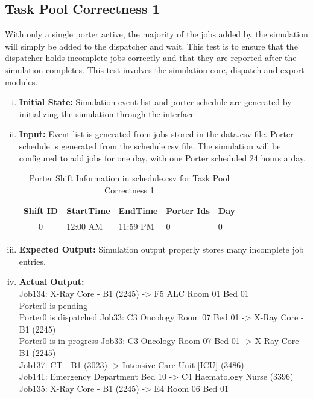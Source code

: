 \documentclass[paper=letter, fontsize=10pt]{scrartcl}
\numberwithin{equation}{section}		%
\numberwithin{figure}{section}			%
\numberwithin{table}{section}				%
\begin{document}
\begin{enumerate}[(i)]
\subsection{Task Pool Correctness 1}
With only a single porter active, the majority of the jobs added by the simulation will simply be added to the dispatcher and wait. This test is to ensure that the dispatcher holds incomplete jobs correctly and that they are reported after the simulation completes. This test involves the simulation core, dispatch and export modules.
\begin{enumerate}[(i)]
	\item \textbf{Initial State:} Simulation event list and porter schedule are generated by initializing the simulation through the interface
	\item \textbf{Input:} Event list is generated from jobs stored in the data.csv file. Porter schedule is generated from the schedule.csv file. The simulation will be configured to add jobs for one day, with one Porter scheduled 24 hours a day.
	\begin{table}
	\caption{Porter Shift Information in schedule.csv for Task Pool Correctness 1}
	\begin{center}
    	\begin{tabular}{| c | l | l | l | l |}
    		\hline
        	Shift ID & StartTime & EndTime & Porter Ids & Day \\ \hline
  			0 & 12:00 AM & 11:59 PM & 0 & 0 \\ \hline
    	\end{tabular}
	\end{center}
	\end{table}
	\item \textbf{Expected Output:} Simulation output properly stores many incomplete job entries.
	\item \textbf{Actual Output:} \\
Job134: X-Ray Core - B1 (2245) -> F5 ALC Room 01 Bed 01\\
Porter0 is pending\\
Porter0 is dispatched Job33: C3 Oncology Room 07 Bed 01 -> X-Ray Core - B1 (2245)\\
Porter0 is in-progress Job33: C3 Oncology Room 07 Bed 01 -> X-Ray Core - B1 (2245)\\
Job137: CT - B1 (3023) -> Intensive Care Unit [ICU] (3486)\\
Job141: Emergency Department Bed 10 -> C4 Haematology Nurse (3396)\\
Job135: X-Ray Core - B1 (2245) -> E4 Room 06 Bed 01\\

\end{enumerate}
\end{enumerate}
\end{document}
